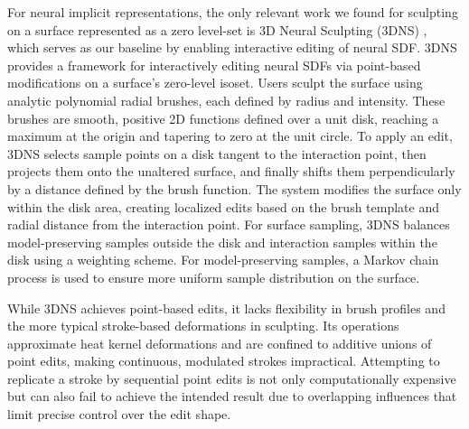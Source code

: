 For neural implicit representations, the only relevant work we found for sculpting on a surface represented as a zero level-set is 3D Neural Sculpting (3DNS) \cite{tzathas20233d}, which serves as our baseline by enabling interactive editing of neural SDF. 3DNS provides a framework for interactively editing neural SDFs via point-based modifications on a surface’s zero-level isoset. Users sculpt the surface using analytic polynomial radial brushes, each defined by radius and intensity. These brushes are smooth, positive 2D functions defined over a unit disk, reaching a maximum at the origin and tapering to zero at the unit circle. To apply an edit, 3DNS selects sample points on a disk tangent to the interaction point,  then projects them onto the unaltered surface, and finally shifts them perpendicularly by a distance defined by the brush function. The system modifies the surface only within the disk area, creating localized edits based on the brush template and radial distance from the interaction point. For surface sampling, 3DNS balances model-preserving samples outside the disk and interaction samples within the disk using a weighting scheme. For model-preserving samples, a Markov chain process is used to ensure more uniform sample distribution on the surface. 

While 3DNS achieves point-based edits, it lacks flexibility in brush profiles and the more typical stroke-based deformations in sculpting. Its operations approximate heat kernel deformations and are confined to additive unions of point edits, making continuous, modulated strokes impractical. Attempting to replicate a stroke by sequential point edits is not only computationally expensive but can also fail to achieve the intended result due to overlapping influences that limit precise control over the edit shape.






